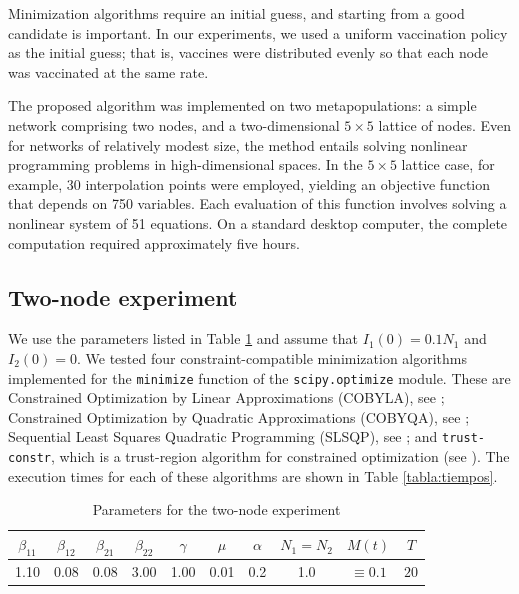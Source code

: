 \documentclass[a4paper,10pt]{article}
\theoremstyle{remark}
\begin{document}
Minimization algorithms require an initial guess, and starting from a good candidate is important. In our experiments, we used a uniform vaccination policy as the initial guess; that is, vaccines were distributed evenly so that each node was vaccinated at the same rate.

The proposed algorithm was implemented on two metapopulations: a simple network comprising two nodes, and a two-dimensional $5\times 5$ lattice of nodes. Even for networks of relatively modest size, the method entails solving nonlinear programming problems in high-dimensional spaces. In the $5\times 5$ lattice case, for example, 30 interpolation points were employed, yielding an objective function that depends on 750 variables. Each evaluation of this function involves solving a nonlinear system of 51 equations. On a standard desktop computer, the complete computation required approximately five hours.

\subsection{Two-node experiment}

We use the parameters listed in Table \ref{tabla:2_nodos} and assume that $I_1(0)=0.1N_1$ and $I_2(0)=0$. We tested four constraint-compatible minimization algorithms implemented for the \texttt{minimize} function of the \texttt{scipy.optimize} module. These are Constrained Optimization by Linear Approximations (COBYLA), see \cite{powell1994direct}; Constrained Optimization by Quadratic Approximations (COBYQA), see \cite{rago_thesis,razh_cobyqa}; Sequential Least Squares Quadratic Programming (SLSQP), see \cite{10.1145/192115.192124,kraft88}; and \texttt{trust-constr}, which is a trust-region algorithm for constrained optimization (see \cite{A.R.Conn1530}). The execution times for each of these algorithms are shown in Table \ref{tabla:tiempos}.



\begin{table}[h]
    \begin{center}
        \begin{tabular}{|c|c|c|c|c|c|c|c|c|c|} \hline
            $\beta_{11}$  &  $\beta_{12}$ &$\beta_{21}$  &  $\beta_{22}$ & $\gamma$& $\mu$ &  $\alpha$ & $N_1=N_2$ & $ M(t)$        & $T$  \\ \hline
            1.10          &          0.08 & 0.08         &          3.00 & 1.00    &  0.01 &       0.2 & 1.0       & $\equiv 0.1$   &$20$  \\ \hline
        \end{tabular}
        \caption{Parameters for the two-node experiment}\label{tabla:2_nodos}
    \end{center}
\end{table}
\end{document}
